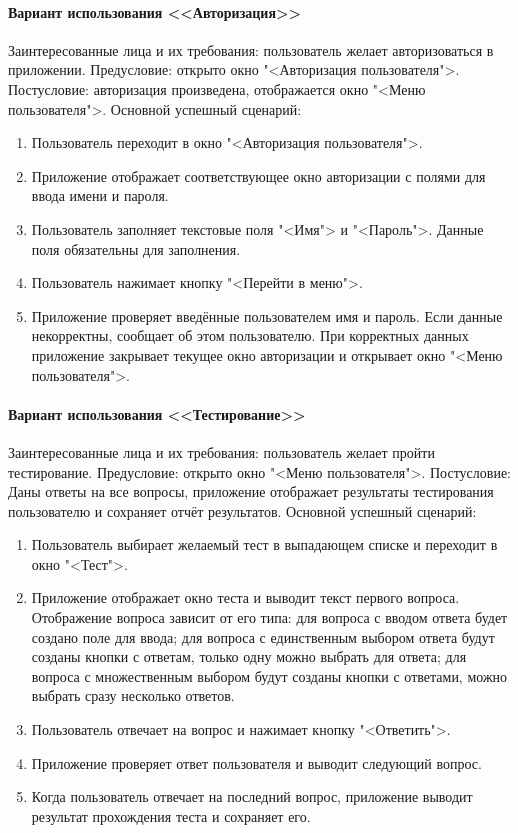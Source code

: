 \paragraph{Вариант использования <<Авторизация>>}

Заинтересованные лица и их требования: пользователь желает авторизоваться в приложении.
Предусловие: открыто окно "<Авторизация пользователя">.
Постусловие: авторизация произведена, отображается окно "<Меню пользователя">.
Основной успешный сценарий:
\begin{enumerate}
	\item Пользователь переходит в окно "<Авторизация пользователя">.
	\item Приложение отображает соответствующее окно авторизации с полями для ввода имени и пароля.
	\item Пользователь заполняет текстовые поля "<Имя"> и "<Пароль">. Данные поля обязательны для заполнения.
	\item Пользователь нажимает кнопку "<Перейти в меню">.
	\item Приложение проверяет введённые пользователем имя и пароль. Если данные некорректны, сообщает об этом пользователю. При корректных данных приложение закрывает текущее окно авторизации и открывает окно "<Меню пользователя">.
\end{enumerate}

\paragraph{Вариант использования <<Тестирование>>}

Заинтересованные лица и их требования: пользователь желает пройти тестирование.
Предусловие: открыто окно "<Меню пользователя">.
Постусловие: Даны ответы на все вопросы, приложение отображает результаты тестирования пользователю и сохраняет отчёт результатов.
Основной успешный сценарий:
\begin{enumerate}
	\item Пользователь выбирает желаемый тест в выпадающем списке и переходит в окно "<Тест">.
	\item Приложение отображает окно теста и выводит текст первого вопроса. Отображение вопроса зависит от его типа: для вопроса с вводом ответа будет создано поле для ввода; для вопроса с единственным выбором ответа будут созданы кнопки с ответам, только одну можно выбрать для ответа; для вопроса с множественным выбором будут созданы кнопки с ответами, можно выбрать сразу несколько ответов.
	\item Пользователь отвечает на вопрос и нажимает кнопку "<Ответить">.
	\item Приложение проверяет ответ пользователя и выводит следующий вопрос. 
	\item Когда пользователь отвечает на последний вопрос, приложение выводит результат прохождения теста и сохраняет его.
\end{enumerate}

